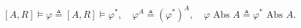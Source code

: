 $$[A,R] \models \varphi \triangleq [A,R] \models \varphi^*, \quad \varphi^A \triangleq (\varphi^*)^A, \quad \varphi \text{ Abs } A \triangleq \varphi^* \text{ Abs } A.$$